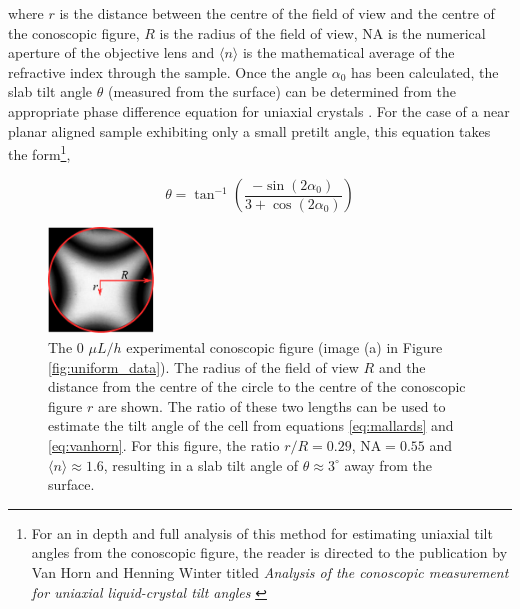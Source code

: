 \noindent where $r$ is the distance between the centre of the field of view and the centre of the conoscopic figure, $R$ is the radius of the field of view, NA is the numerical aperture of the objective lens and $\langle n\rangle$ is the mathematical average of the refractive index through the sample. Once the angle $\alpha_0$ has been calculated, the slab tilt angle $\theta$ (measured from the surface) can be determined from the appropriate phase difference equation for uniaxial crystals \cite{Horn2001}. For the case of a near planar aligned sample exhibiting only a small pretilt angle, this equation takes the form\footnote{For an in depth and full analysis of this method for estimating uniaxial tilt angles from the conoscopic figure, the reader is directed to the publication by Van Horn and Henning Winter titled \textit{Analysis of the conoscopic measurement for uniaxial liquid-crystal tilt angles} \cite{Horn2001}},

\begin{equation}
\label{eq:vanhorn}
\theta=\tan^{-1}\left(\frac{-\sin\left(2\alpha_0\right)}{3+\cos\left(2\alpha_0\right)}\right)
\end{equation}

\begin{figure}
\begin{center}
\includegraphics[width=0.25\textwidth]{Figures/90/calculate_tilt_pdf}
\end{center}
\caption[Estimation of the uniform tilt angle from the conoscopic figure]{\label{fig:calculate_tilt}The 0 $\mu L/h$ experimental conoscopic figure (image (a) in Figure \ref{fig:uniform_data}). The radius of the field of view $R$ and the distance from the centre of the circle to the centre of the conoscopic figure $r$ are shown. The ratio of these two lengths can be used to estimate the tilt angle of the cell from equations \ref{eq:mallards} and \ref{eq:vanhorn}. For this figure, the ratio $r/R=0.29$, $\text{NA}=0.55$ and $\langle n\rangle\approx1.6$, resulting in a slab tilt angle of $\theta\approx3^{\circ}$ away from the surface.}
\end{figure}

